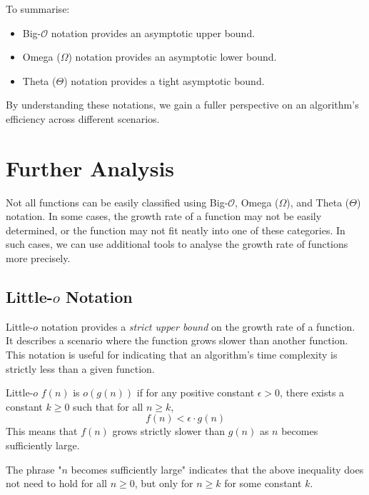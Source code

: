To summarise:
\begin{itemize}
    \item Big-$\mathcal{O}$ notation provides an asymptotic upper bound.
    \item Omega ($\Omega$) notation provides an asymptotic lower bound.
    \item Theta ($\Theta$) notation provides a tight asymptotic bound.
\end{itemize}

By understanding these notations, we gain a fuller perspective on an algorithm’s efficiency across different scenarios.

\section{Further Analysis}
Not all functions can be easily classified using Big-$\mathcal{O}$, Omega ($\Omega$), and Theta ($\Theta$) notation. In some cases, the growth rate of a function may not be easily determined, or the function may not fit neatly into one of these categories. In such cases, we can use additional tools to analyse the growth rate of functions more precisely.

\subsection*{Little-\texorpdfstring{$o$}{o} Notation}
Little-$o$ notation provides a \textit{strict upper bound} on the growth rate of a function. It describes a scenario where the function grows slower than another function. This notation is useful for indicating that an algorithm's time complexity is strictly less than a given function.

\begin{definition}{Little-$o$}\label{def:little_o_notation}
    $f(n)$ is $o(g(n))$ if for any positive constant $\epsilon > 0$, there exists a constant $k \geq 0$ such that for all $n \geq k$,
    \medskip
    \[
    f(n) < \epsilon \cdot g(n)
    \]
    \medskip
    This means that $f(n)$ grows strictly slower than $g(n)$ as $n$ becomes sufficiently large.
    
\end{definition}

The phrase "$n$ becomes sufficiently large" indicates that the above inequality does not need to hold for all $n \geq 0$, but only for $n \geq k$ for some constant $k$.

